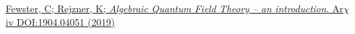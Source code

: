 \documentclass[a4paper,11pt]{article}
\numberwithin{equation}{section}
\theoremstyle{definition}
\newtheorem{comment}{Comment}
\begin{document}

\newpage
\begin{thebibliography}{99}

    \href{https://arxiv.org/abs/1904.04051}{Fewster, C; Rejzner, K; \textit{Algebraic Quantum Field Theory -- an introduction}. Ar$\chi$iv DOI:1904.04051 (2019)} 
        
\end{thebibliography}
\end{document}
